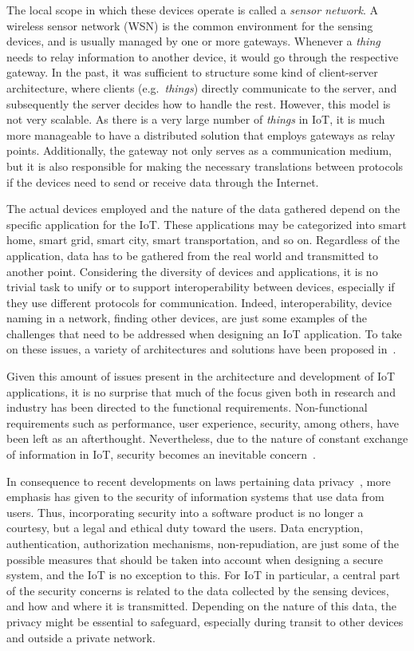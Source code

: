 \documentclass[12pt]{article}
\begin{document}
The local scope in which these devices operate is called a \emph{sensor network}. A wireless sensor network (WSN) is the common environment for the sensing devices, and is usually managed by one or more gateways. Whenever a \emph{thing} needs to relay information to another device, it would go through the respective gateway. In the past, it was sufficient to structure some kind of client-server architecture, where clients (e.g.\ \emph{things}) directly communicate to the server, and subsequently the server decides how to handle the rest. However, this model is not very scalable. As there is a very large number of \emph{things} in IoT, it is much more manageable to have a distributed solution that employs gateways as relay points. Additionally, the gateway not only serves as a communication medium, but it is also responsible for making the necessary translations between protocols if the devices need to send or receive data through the Internet.

The actual devices employed and the nature of the data gathered depend on the specific application for the IoT. These applications may be categorized into smart home, smart grid, smart city, smart transportation, and so on. Regardless of the application, data has to be gathered from the real world and transmitted to another point. Considering the diversity of devices and applications, it is no trivial task to unify or to support interoperability between devices, especially if they use different protocols for communication. Indeed, interoperability, device naming in a network, finding other devices, are just some examples of the challenges that need to be addressed when designing an IoT application. To take on these issues, a variety of architectures and solutions have been proposed in~\cite{ALABA201710}. 

Given this amount of issues present in the architecture and development of IoT applications, it is no surprise that much of the focus given both in research and industry has been directed to the functional requirements. Non-functional requirements such as performance, user experience, security, among others, have been left as an afterthought. Nevertheless, due to the nature of constant exchange of information in IoT, security becomes an inevitable concern~\cite{Zhang:2015}.

In consequence to recent developments on laws pertaining data privacy~\cite{eu_law}, more emphasis has given to the security of information systems that use data from users. Thus, incorporating security into a software product is no longer a courtesy, but a legal and ethical duty toward the users. Data encryption, authentication, authorization mechanisms, non-repudiation, are just some of the possible measures that should be taken into account when designing a secure system, and the IoT is no exception to this. For IoT in particular, a central part of the security concerns is related to the data collected by the sensing devices, and how and where it is transmitted. Depending on the nature of this data, the privacy might be essential to safeguard, especially during transit to other devices and outside a private network.
\end{document}
